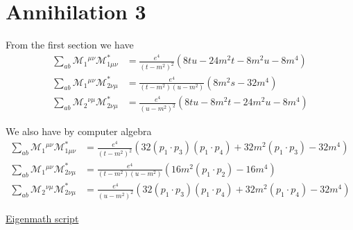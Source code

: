

\section*{Annihilation 3}

From the first section we have
\begin{align*}
\sum_{ab}\mathcal M_1{}^{\mu\nu}\mathcal M^*_{1\mu\nu}
&=\frac{e^4}{(t-m^2)^2}
\left(8 t u - 24 m^2 t - 8 m^2 u - 8 m^4\right)
\\
\sum_{ab}\mathcal M_1{}^{\mu\nu}\mathcal M^*_{2\nu\mu}
&=\frac{e^4}{(t-m^2)(u-m^2)}
\left(8 m^2 s - 32 m^4\right)
\\
\sum_{ab}\mathcal M_2{}^{\nu\mu}\mathcal M^*_{2\nu\mu}
&=\frac{e^4}{(u-m^2)^2}
\left(8 t u - 8 m^2 t - 24 m^2 u - 8 m^4\right)
\end{align*}

We also have by computer algebra
\begin{align*}
\sum_{ab}\mathcal M_1{}^{\mu\nu}\mathcal M^*_{1\mu\nu}
&=\frac{e^4}{(t-m^2)^2}
\left(
32 (p_1\cdot p_3) (p_1\cdot p_4) + 32 m^2 (p_1\cdot p_3) - 32 m^4
\right)
\\
\sum_{ab}\mathcal M_1{}^{\mu\nu}\mathcal M^*_{2\nu\mu}
&=\frac{e^4}{(t-m^2)(u-m^2)}
\left(
16 m^2 (p_1\cdot p_2) - 16 m^4
\right)
\\
\sum_{ab}\mathcal M_2{}^{\nu\mu}\mathcal M^*_{2\nu\mu}
&=\frac{e^4}{(u-m^2)^2}
\left(
32 (p_1\cdot p_3) (p_1\cdot p_4) + 32 m^2 (p_1\cdot p_4) - 32 m^4
\right)
\end{align*}

\href{https://georgeweigt.github.io/examples/annihilation-3-demo.html}{Eigenmath script}


